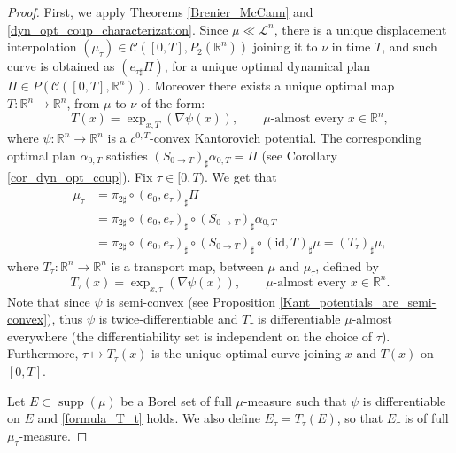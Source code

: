 \documentclass[reqno]{amsart}
\DeclareMathOperator{\supp}{supp}
\theoremstyle{plain}
\theoremstyle{definition}
\theoremstyle{remark}
\newcommand{\R}{\mathbb{R}}
\begin{document}
	\begin{proof}
		First, we apply Theorems \ref{Brenier_McCann} and \ref{dyn_opt_coup_characterization}.
		Since $\mu\ll\mathscr{L}^n$, there is a unique displacement interpolation $(\mu_\tau)\in\mathcal{C}([0,T],P_2(\mathbb{R}^n))$ joining it to $\nu$ in time $T$, and such curve is obtained as $(e_{\tau\sharp}\Pi)$, for a unique optimal dynamical plan $\Pi\in P(\mathcal{C}([0,T],\mathbb{R}^n))$. Moreover there exists a unique optimal map $T:\mathbb{R}^n\to\mathbb{R}^n$, from $\mu$ to $\nu$ of the form:
            \begin{equation}
			T(x)=\exp_{x,T}(\nabla\psi(x)),\qquad\mu\text{-almost every }x\in\mathbb{R}^n,
		\end{equation}
        where $\psi:\mathbb{R}^n\to\mathbb{R}^n$ is a $c^{0,T}$-convex Kantorovich potential. The corresponding optimal plan $\alpha_{0,T}$ satisfies $(S_{0\to T})_{\sharp}\alpha_{0,T}=\Pi$ (see Corollary \ref{cor_dyn_opt_coup}). Fix $\tau\in [0,T)$. We get that
		\begin{align}
			\mu_\tau &=\pi_{2\sharp}\circ(e_0,e_\tau)_{\sharp}\Pi\\
			&=\pi_{2\sharp}\circ(e_0,e_\tau)_{\sharp}\circ(S_{0\to T})_{\sharp}\alpha_{0,T}\\
			&=\pi_{2\sharp}\circ(e_0,e_\tau)_{\sharp}\circ(S_{0\to T})_{\sharp}\circ(\mathrm{id},T)_{\sharp}\mu = (T_\tau)_{\sharp}\mu,
		\end{align}
        where $T_\tau:\R^n \to \R^n$ is a transport map, between $\mu$ and $\mu_\tau$, defined by
		\begin{equation}\label{formula_T_t}
			T_\tau(x)=\exp_{x,\tau}(\nabla\psi(x)),\qquad\mu\text{-almost every }x\in\mathbb{R}^n.
		\end{equation}
        Note that since $\psi$ is semi-convex (see Proposition \ref{Kant_potentials_are_semi-convex}), thus $\psi$ is twice-differentiable and $T_\tau$ is differentiable $\mu$-almost everywhere (the differentiability set is independent on the choice of $\tau$). Furthermore, $\tau\mapsto T_\tau(x)$ is the unique optimal curve joining $x$ and $T(x)$ on $[0,T]$.
		
		Let $E\subset\supp(\mu)$ be a Borel set of full $\mu$-measure such that $\psi$ is differentiable on $E$ and \eqref{formula_T_t} holds. We also define $E_\tau=T_\tau(E)$, so that $E_\tau$ is of full $\mu_\tau$-measure.


\end{proof}
\end{document}
